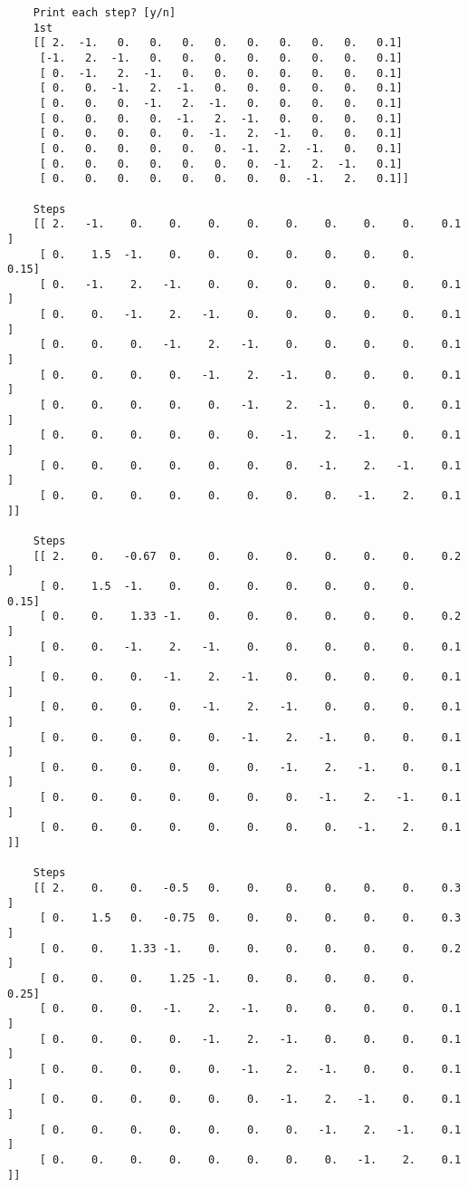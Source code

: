 \documentclass{article}
\begin{document}
\begin{lstlisting}
    Print each step? [y/n]
    1st
    [[ 2.  -1.   0.   0.   0.   0.   0.   0.   0.   0.   0.1]
     [-1.   2.  -1.   0.   0.   0.   0.   0.   0.   0.   0.1]
     [ 0.  -1.   2.  -1.   0.   0.   0.   0.   0.   0.   0.1]
     [ 0.   0.  -1.   2.  -1.   0.   0.   0.   0.   0.   0.1]
     [ 0.   0.   0.  -1.   2.  -1.   0.   0.   0.   0.   0.1]
     [ 0.   0.   0.   0.  -1.   2.  -1.   0.   0.   0.   0.1]
     [ 0.   0.   0.   0.   0.  -1.   2.  -1.   0.   0.   0.1]
     [ 0.   0.   0.   0.   0.   0.  -1.   2.  -1.   0.   0.1]
     [ 0.   0.   0.   0.   0.   0.   0.  -1.   2.  -1.   0.1]
     [ 0.   0.   0.   0.   0.   0.   0.   0.  -1.   2.   0.1]]
     
    Steps
    [[ 2.   -1.    0.    0.    0.    0.    0.    0.    0.    0.    0.1 ]
     [ 0.    1.5  -1.    0.    0.    0.    0.    0.    0.    0.    0.15]
     [ 0.   -1.    2.   -1.    0.    0.    0.    0.    0.    0.    0.1 ]
     [ 0.    0.   -1.    2.   -1.    0.    0.    0.    0.    0.    0.1 ]
     [ 0.    0.    0.   -1.    2.   -1.    0.    0.    0.    0.    0.1 ]
     [ 0.    0.    0.    0.   -1.    2.   -1.    0.    0.    0.    0.1 ]
     [ 0.    0.    0.    0.    0.   -1.    2.   -1.    0.    0.    0.1 ]
     [ 0.    0.    0.    0.    0.    0.   -1.    2.   -1.    0.    0.1 ]
     [ 0.    0.    0.    0.    0.    0.    0.   -1.    2.   -1.    0.1 ]
     [ 0.    0.    0.    0.    0.    0.    0.    0.   -1.    2.    0.1 ]]
     
    Steps
    [[ 2.    0.   -0.67  0.    0.    0.    0.    0.    0.    0.    0.2 ]
     [ 0.    1.5  -1.    0.    0.    0.    0.    0.    0.    0.    0.15]
     [ 0.    0.    1.33 -1.    0.    0.    0.    0.    0.    0.    0.2 ]
     [ 0.    0.   -1.    2.   -1.    0.    0.    0.    0.    0.    0.1 ]
     [ 0.    0.    0.   -1.    2.   -1.    0.    0.    0.    0.    0.1 ]
     [ 0.    0.    0.    0.   -1.    2.   -1.    0.    0.    0.    0.1 ]
     [ 0.    0.    0.    0.    0.   -1.    2.   -1.    0.    0.    0.1 ]
     [ 0.    0.    0.    0.    0.    0.   -1.    2.   -1.    0.    0.1 ]
     [ 0.    0.    0.    0.    0.    0.    0.   -1.    2.   -1.    0.1 ]
     [ 0.    0.    0.    0.    0.    0.    0.    0.   -1.    2.    0.1 ]]
     
    Steps
    [[ 2.    0.    0.   -0.5   0.    0.    0.    0.    0.    0.    0.3 ]
     [ 0.    1.5   0.   -0.75  0.    0.    0.    0.    0.    0.    0.3 ]
     [ 0.    0.    1.33 -1.    0.    0.    0.    0.    0.    0.    0.2 ]
     [ 0.    0.    0.    1.25 -1.    0.    0.    0.    0.    0.    0.25]
     [ 0.    0.    0.   -1.    2.   -1.    0.    0.    0.    0.    0.1 ]
     [ 0.    0.    0.    0.   -1.    2.   -1.    0.    0.    0.    0.1 ]
     [ 0.    0.    0.    0.    0.   -1.    2.   -1.    0.    0.    0.1 ]
     [ 0.    0.    0.    0.    0.    0.   -1.    2.   -1.    0.    0.1 ]
     [ 0.    0.    0.    0.    0.    0.    0.   -1.    2.   -1.    0.1 ]
     [ 0.    0.    0.    0.    0.    0.    0.    0.   -1.    2.    0.1 ]]
     

\end{lstlisting}
\end{document}
